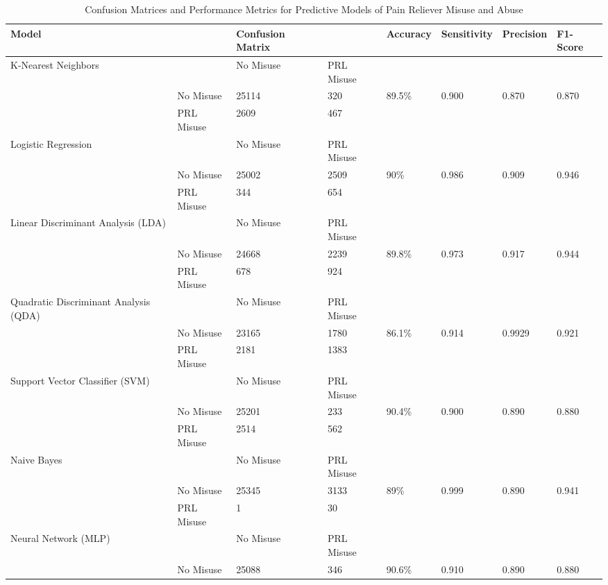 \documentclass[sigconf]{acmart}
\begin{document}
 
\begin{table*}[ht]
  \caption{Confusion Matrices and Performance Metrics for Predictive Models of 
  Pain Reliever Misuse and Abuse}
  \label{tab:freq}
  \begin{tabular}{llllllll}
    \toprule
    Model& & Confusion Matrix & & Accuracy & Sensitivity & Precision & F1-Score \\
    \midrule
    K-Nearest Neighbors & & No Misuse & PRL Misuse &  &  &  & \\
     & No Misuse & 25114 & 320 & 89.5\% & 0.900 & 0.870 & 0.870 \\
     & PRL Misuse & 2609 & 467 &  &  &  & \\
    \midrule
    Logistic Regression & & No Misuse & PRL Misuse &  &  &  & \\
     & No Misuse & 25002 & 2509 & 90\% & 0.986 & 0.909 & 0.946 \\
     & PRL Misuse & 344 & 654 &  &  &  & \\
    \midrule
    Linear Discriminant Analysis (LDA) & & No Misuse & PRL Misuse &  &  &  & \\
     & No Misuse & 24668 & 2239 & 89.8\% & 0.973 & 0.917 & 0.944 \\
     & PRL Misuse & 678 & 924 &  &  &  & \\
    \midrule
    Quadratic Discriminant Analysis (QDA) & & No Misuse & PRL Misuse &  &  &  & \\
     & No Misuse & 23165 & 1780 & 86.1\% & 0.914 & 0.9929 & 0.921 \\
     & PRL Misuse & 2181 & 1383 &  &  &  & \\
    \midrule
    Support Vector Classifier (SVM) & & No Misuse & PRL Misuse &  &  &  & \\
     & No Misuse & 25201 & 233 & 90.4\% & 0.900 & 0.890 & 0.880 \\
     & PRL Misuse & 2514 & 562 &  &  &  & \\
    \midrule
    Naive Bayes & & No Misuse & PRL Misuse &  &  &  & \\
     & No Misuse & 25345 & 3133 & 89\% & 0.999 & 0.890 & 0.941 \\
     & PRL Misuse & 1 & 30 &  &  &  & \\
    \midrule
    Neural Network (MLP) & & No Misuse & PRL Misuse &  &  &  & \\
     & No Misuse & 25088 & 346 & 90.6\% & 0.910 & 0.890 & 0.880 \\

\end{tabular}
\end{table*}
\end{document}

